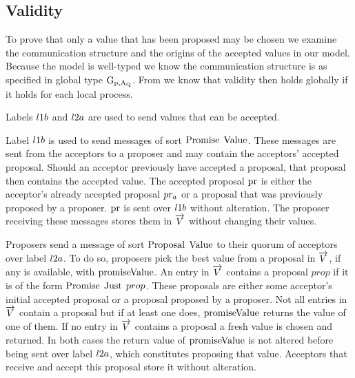 \subsection{Validity}
To prove that only a value that has been proposed may be chosen we examine the communication structure and the origins of the accepted values in our model.
Because the model is well-typed we know the communication structure is as specified in global type $\operatorname{G_{p, A_Q}}$.
From \cite{PetersEtal21} we know that validity then holds globally if it holds for each local process.

Labels $l1b$ and $l2a$ are used to send values that can be accepted.

Label $l1b$ is used to send messages of sort $\operatorname{Promise}\; \operatorname{Value}$.
These messages are sent from the acceptors to a proposer and may contain the acceptors' accepted proposal.
Should an acceptor previously have accepted a proposal, that proposal then contains the accepted value.
The accepted proposal $\operatorname{pr}$ is either the acceptor's already accepted proposal $pr_{a}$ or a proposal that was previously proposed by a proposer.
$\operatorname{pr}$ is sent over $l1b$ without alteration.
The proposer receiving these messages stores them in $\overrightarrow{V}$ without changing their values.

Proposers send a message of sort $\operatorname{Proposal}\; \operatorname{Value}$ to their quorum of acceptors over label $l2a$.
To do so, proposers pick the best value from a proposal in $\overrightarrow{V}$, if any is available, with $\operatorname{promiseValue}$.
An entry in $\overrightarrow{V}$ contains a proposal $prop$ if it is of the form $\operatorname{Promise}\; \operatorname{Just}\; prop$.
These proposals are either some acceptor's initial accepted proposal or a proposal proposed by a proposer.
Not all entries in $\overrightarrow{V}$ contain a proposal but if at least one does, $\operatorname{promiseValue}$ returns the value of one of them.
If no entry in $\overrightarrow{V}$ contains a proposal a fresh value is chosen and returned.
In both cases the return value of $\operatorname{promiseValue}$ is not altered before being sent over label $l2a$, which constitutes proposing that value.
Acceptors that receive and accept this proposal store it without alteration.

